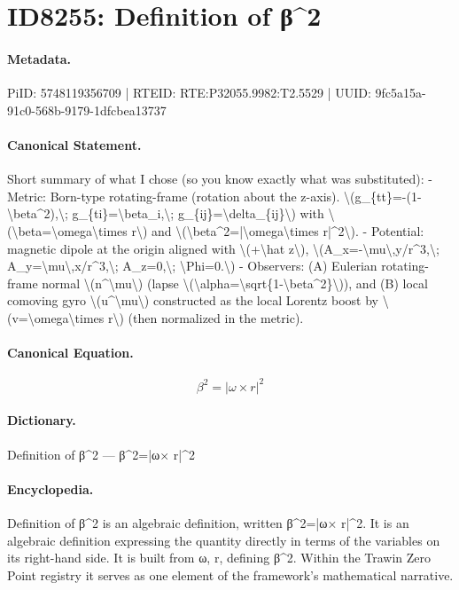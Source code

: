 \section*{ID8255: Definition of β\textasciicircum{}2}
\paragraph{Metadata.}
PiID: 5748119356709 | RTEID: RTE:P32055.9982:T2.5529 | UUID: 9fc5a15a-91c0-568b-9179-1dfcbea13737

\paragraph{Canonical Statement.}
Short summary of what I chose (so you know exactly what was substituted): - Metric: Born-type rotating-frame (rotation about the z-axis). \textbackslash{}(g\_\{tt\}=-(1-\textbackslash{}beta\textasciicircum{}2),\textbackslash{}; g\_\{ti\}=\textbackslash{}beta\_i,\textbackslash{}; g\_\{ij\}=\textbackslash{}delta\_\{ij\}\textbackslash{}) with \textbackslash{}(\textbackslash{}beta=\textbackslash{}omega\textbackslash{}times r\textbackslash{}) and \textbackslash{}(\textbackslash{}beta\textasciicircum{}2=|\textbackslash{}omega\textbackslash{}times r|\textasciicircum{}2\textbackslash{}). - Potential: magnetic dipole at the origin aligned with \textbackslash{}(+\textbackslash{}hat z\textbackslash{}), \textbackslash{}(A\_x=-\textbackslash{}mu\textbackslash{},y/r\textasciicircum{}3,\textbackslash{}; A\_y=\textbackslash{}mu\textbackslash{},x/r\textasciicircum{}3,\textbackslash{}; A\_z=0,\textbackslash{}; \textbackslash{}Phi=0.\textbackslash{}) - Observers: (A) Eulerian rotating-frame normal \textbackslash{}(n\textasciicircum{}\textbackslash{}mu\textbackslash{}) (lapse \textbackslash{}(\textbackslash{}alpha=\textbackslash{}sqrt\{1-\textbackslash{}beta\textasciicircum{}2\}\textbackslash{})), and (B) local comoving gyro \textbackslash{}(u\textasciicircum{}\textbackslash{}mu\textbackslash{}) constructed as the local Lorentz boost by \textbackslash{}(v=\textbackslash{}omega\textbackslash{}times r\textbackslash{}) (then normalized in the metric).

\paragraph{Canonical Equation.}
\[
\beta^2=|\omega\times r|^2
\]

\paragraph{Dictionary.}
Definition of β\textasciicircum{}2 — β\textasciicircum{}2=|ω× r|\textasciicircum{}2

\paragraph{Encyclopedia.}
Definition of β\textasciicircum{}2 is an algebraic definition, written β\textasciicircum{}2=|ω× r|\textasciicircum{}2. It is an algebraic definition expressing the quantity directly in terms of the variables on its right-hand side. It is built from ω, r, defining β\textasciicircum{}2. Within the Trawin Zero Point registry it serves as one element of the framework's mathematical narrative.
